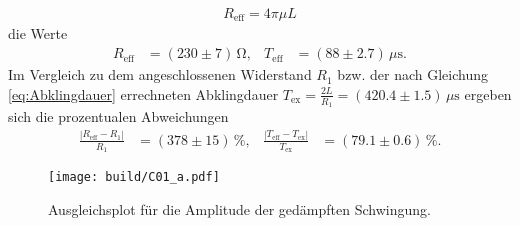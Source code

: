 \begin{align*}
    R_\text{eff} = 4 \pi \mu L
\end{align*}
die Werte 
\begin{align}
    R_\text{eff} &= (\num[]{230} \pm \num[]{7}) \, \unit{\ohm}, & 
    T_\text{eff} &= (\num[]{88} \pm \num[]{2.7}) \, \mu \unit{\second}.
\end{align}
Im Vergleich zu dem angeschlossenen Widerstand $R_1$ bzw. der nach Gleichung \eqref{eq:Abklingdauer} errechneten Abklingdauer
$T_\text{ex} = \frac{2L}{R_1} = (\num[]{420.4} \pm \num[]{1.5}) \, \mu \unit{\second}$
ergeben sich die prozentualen Abweichungen
\begin{align*}
    \frac{|R_\text{eff} - R_1|}{R_1} &= (\num[]{378} \pm \num[]{15}) \, \%, &
    \frac{|T_\text{eff} - T_\text{ex}|}{T_\text{ex}} &= (\num[]{79.1} \pm \num[]{0.6}) \, \%.
\end{align*}
\begin{figure}[H]
    \centering
    \texttt{[image: build/C01\_a.pdf]}
    \caption{Ausgleichsplot für die Amplitude der gedämpften Schwingung.}
    \label{fig:plot_amplitude}
\end{figure}
